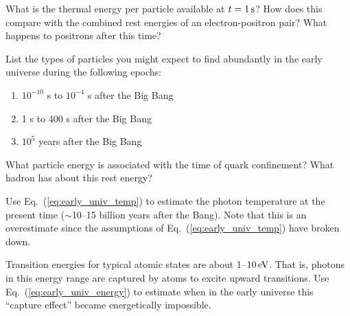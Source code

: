 \begin{problem}
What is the thermal energy per particle available at $t = 1\,\mbox{s}$?  How does this
compare with the combined rest energies of an electron-positron
pair?  What happens to positrons after this time?
\label{prob:electron_pair_production}
\end{problem}

\begin{problem}
List the types of particles you might expect to find abundantly
in the early universe during the following epochs:
  \begin{enumerate}
  \item $10^{-10}$ s to $10^{-4}$ s after the Big Bang
  \item 1 s to 400 s after the Big Bang
  \item $10^5$ years after the Big Bang
  \end{enumerate}
\label{prob:particles_and_epochs}
\end{problem}

\begin{problem}
What particle energy is associated with the time of quark
confinement?  What hadron has about this rest energy?
\label{prob:quark_confinement}
\end{problem}

\begin{problem}
Use Eq.~(\ref{eq:early_univ_temp}) to estimate the photon
temperature at the present time ($\sim$10--15 billion years after
the Bang).  Note that this is an overestimate since the assumptions
of Eq.~(\ref{eq:early_univ_temp}) have broken down.
\label{prob:background_radiation}
\end{problem}

\begin{problem}
Transition energies for typical atomic states are about
1--$10\,\mbox{eV}$. That is, photons in this energy range are captured 
by atoms to excite upward transitions.  Use Eq.~(\ref{eq:early_univ_energy}) 
to estimate when in the early universe this ``capture effect'' became
energetically impossible.  
\label{prob:transparent_universe}
\end{problem}

\newpage

